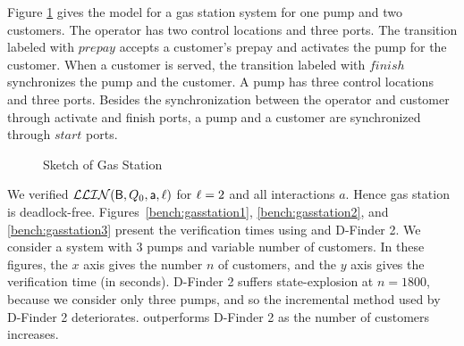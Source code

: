 Figure \ref{fig:gas-station} gives the model for a
gas station system for one pump and two customers.  The operator has
two control locations and three ports. The transition labeled with
$\mathit{prepay}$ accepts a customer's prepay and activates the pump for the
customer. When a customer is served, the transition labeled with
$\mathit{finish}$ synchronizes the pump and the customer.  A pump has three
control locations and three ports. Besides the synchronization between
the operator and customer through activate and finish ports, a pump
and a customer are synchronized through $\mathit{start}$ ports.

\begin{figure}[ht]
\begin{center}
\scalebox{0.5}{}
\caption{Sketch of Gas Station}
\label{fig:gas-station}
\end{center}
\end{figure}


We verified $\mathcal{LLIN}(\mathsf{B}, Q_0, \mathsf{a}, \ell)$ for $\ell=2$ and all interactions $a$.
Hence gas station is deadlock-free.  Figures~\ref{bench:gasstation1},
\ref{bench:gasstation2}, and \ref{bench:gasstation3} present the verification
times using \ldfctool and D-Finder 2. We consider a system with 3 pumps and variable number
of customers.  In these figures, the $x$ axis gives the number $n$ of
customers, and the $y$ axis gives the verification time (in seconds).
%
D-Finder 2 suffers state-explosion at $n = 1800$,
because we consider only three pumps, and so the incremental method used by
D-Finder 2 deteriorates. \ldfctool outperforms D-Finder 2 as the number of
customers increases.


